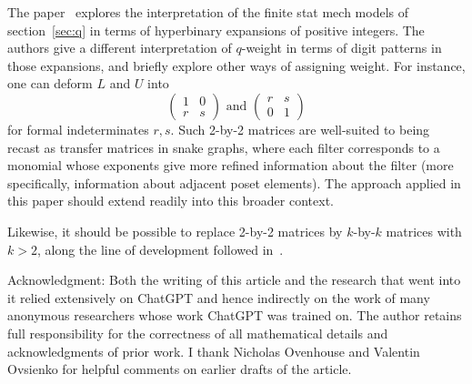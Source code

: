 \documentclass[12pt]{article}
\theoremstyle{plain}
\theoremstyle{definition}
\theoremstyle{remark}
\begin{document}
\bigskip

The paper~\cite{MPS25} explores
the interpretation of the finite stat mech models of section~\ref{sec:q}
in terms of hyperbinary expansions of positive integers.
The authors give a different interpretation of $q$-weight
in terms of digit patterns in those expansions,
and briefly explore other ways of assigning weight.
For instance, one can deform $L$ and $U$ into
$$\left( \begin{array}{cc} 1 & 0 \\ r & s \end{array} \right) \mbox{\ and \ }
\left( \begin{array}{cc} r & s \\ 0 & 1 \end{array} \right)$$
for formal indeterminates $r,s$.
Such 2-by-2 matrices are
well-suited to being recast as transfer matrices in snake graphs,
where each filter corresponds to a monomial
whose exponents give more refined information about the filter
(more specifically, information about adjacent poset elements).
The approach applied in this paper should extend readily
into this broader context. 

Likewise, it should be possible to replace 2-by-2 matrices
by $k$-by-$k$ matrices with $k>2$,
along the line of development followed in~\cite{BOSZ24}.

\bigskip

{\sc Acknowledgment:} 
Both the writing of this article
and the research that went into it relied extensively
on ChatGPT and hence indirectly on the work of many
anonymous researchers whose work ChatGPT was trained on. 
The author retains full responsibility for the correctness
of all mathematical details and acknowledgments of prior
work. I thank Nicholas Ovenhouse and Valentin Ovsienko for 
helpful comments on earlier drafts of the article.
\end{document}
